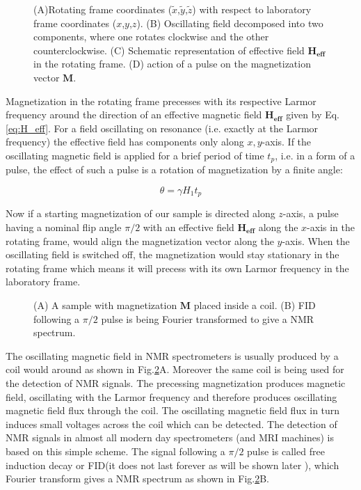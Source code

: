 \documentclass[a4paper, 12pt]{article}
\begin{document}
\begin{figure}[ht]
\caption{(A)Rotating frame coordinates ($\tilde{x}$,$\tilde{y}$,$\tilde{z}$) with respect to laboratory frame coordinates ($x$,$y$,$z$). (B) Oscillating field decomposed into two components, where one rotates clockwise and the other counterclockwise. (C) Schematic representation of effective field $\bm{H_{eff}}$ in the rotating frame. (D) action of a pulse on the magnetization vector $\bm{M}$.}
\label{fig:rot_frame}
\centering
\end{figure}

 Magnetization in the rotating frame precesses with its respective Larmor frequency around the direction of an effective magnetic field $\bm{H_{eff}}$ given by Eq.\ref{eq:H_eff}. For a field oscillating on resonance (i.e. exactly at the Larmor frequency) the effective field has components only along $x,y$-axis. If the oscillating magnetic field is applied for a brief period of time $t_p$, i.e. in a form of a pulse, the effect of such a pulse is a rotation of magnetization by a finite angle:

\begin{equation}
\theta = \gamma H_1 t_p
\end{equation}

Now if a starting magnetization of our sample is directed along $z$-axis, a pulse having a nominal flip angle $\pi/2$ with an effective field $\bm{H_{eff}}$ along the $x$-axis in the rotating frame, would align the magnetization vector along the $y$-axis. When the oscillating field is switched off, the magnetization would stay stationary in the rotating frame which means it will precess with its own Larmor frequency in the laboratory frame.

\begin{figure}[ht]
\caption{(A) A sample with magnetization $\bm{M}$ placed inside a coil. (B) FID following a $\pi/2$ pulse is being Fourier transformed to give a NMR spectrum.}
\label{fig:sample_coil}
\centering
\end{figure}

The oscillating magnetic field in NMR spectrometers is usually produced by a coil would around as shown in Fig.\ref{fig:sample_coil}A. Moreover the same coil is being used for the detection of NMR signals. The precessing magnetization produces magnetic field, oscillating with the Larmor frequency and therefore produces oscillating  magnetic field flux through the coil. The oscillating magnetic field flux in turn induces small voltages across the coil which can be detected. The detection of NMR signals in almost all modern day spectrometers (and MRI machines) is based on this simple scheme. The signal following a $\pi/2$ pulse is called free induction decay or FID(it does not last forever as will be shown later ), which Fourier transform gives a NMR spectrum as shown in Fig.\ref{fig:sample_coil}B.
\end{document}
